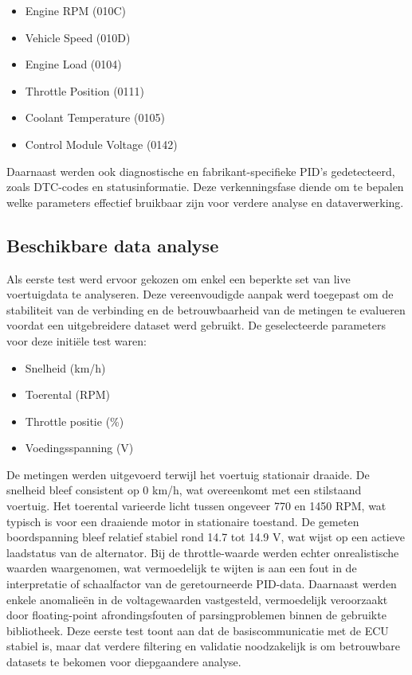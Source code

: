 \begin{itemize}
    \item Engine RPM (010C)
    \item Vehicle Speed (010D)
    \item Engine Load (0104)
    \item Throttle Position (0111)
    \item Coolant Temperature (0105)
    \item Control Module Voltage (0142)
\end{itemize}

Daarnaast werden ook diagnostische en fabrikant-specifieke PID’s gedetecteerd, zoals DTC-codes en statusinformatie. Deze verkenningsfase diende om te bepalen welke parameters effectief bruikbaar zijn voor verdere analyse en dataverwerking.

\subsection{Beschikbare data analyse}
Als eerste test werd ervoor gekozen om enkel een beperkte set van live voertuigdata te analyseren. Deze vereenvoudigde aanpak werd toegepast om de stabiliteit van de verbinding en de betrouwbaarheid van de metingen te evalueren voordat een uitgebreidere dataset werd gebruikt.
De geselecteerde parameters voor deze initiële test waren:

\begin{itemize}
    \item Snelheid (km/h)
    \item Toerental (RPM)
    \item Throttle positie (\%)
    \item Voedingsspanning (V)
\end{itemize}

De metingen werden uitgevoerd terwijl het voertuig stationair draaide. De snelheid bleef consistent op 0 km/h, wat overeenkomt met een stilstaand voertuig. Het toerental varieerde licht tussen ongeveer 770 en 1450 RPM, wat typisch is voor een draaiende motor in stationaire toestand.
De gemeten boordspanning bleef relatief stabiel rond 14.7 tot 14.9 V, wat wijst op een actieve laadstatus van de alternator.
Bij de throttle-waarde werden echter onrealistische waarden waargenomen, wat vermoedelijk te wijten is aan een fout in de interpretatie of schaalfactor van de geretourneerde PID-data. Daarnaast werden enkele anomalieën in de voltagewaarden vastgesteld, vermoedelijk veroorzaakt door floating-point afrondingsfouten of parsingproblemen binnen de gebruikte bibliotheek.
Deze eerste test toont aan dat de basiscommunicatie met de ECU stabiel is, maar dat verdere filtering en validatie noodzakelijk is om betrouwbare datasets te bekomen voor diepgaandere analyse.

